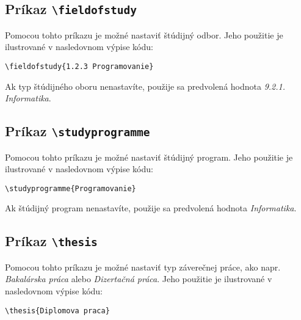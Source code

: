 \subsection{Príkaz {\tt \textbackslash{}fieldofstudy}}

Pomocou tohto príkazu je možné nastaviť štúdijný odbor. Jeho použitie je ilustrované v nasledovnom výpise kódu:

\begin{listing}[ht!]
\begin{verbatim}
\fieldofstudy{1.2.3 Programovanie}
\end{verbatim}
\caption{Príklad použitia príkazu {\tt \textbackslash{}fieldofstudy} pre nastavenie štúdijného oboru}
\end{listing}

Ak typ štúdijného oboru nenastavíte, použije sa predvolená hodnota {\it 9.2.1. Informatika}.


\subsection{Príkaz {\tt \textbackslash{}studyprogramme}}

Pomocou tohto príkazu je možné nastaviť štúdijný program. Jeho použitie je ilustrované v nasledovnom výpise kódu:

\begin{listing}[ht!]
\begin{verbatim}
\studyprogramme{Programovanie}
\end{verbatim}
\caption{Príklad použitia príkazu {\tt \textbackslash{}studyprogramme} pre nastavenie štúdijného programu}
\end{listing}

Ak štúdijný program nenastavíte, použije sa predvolená hodnota {\it Informatika}.


\subsection{Príkaz {\tt \textbackslash{}thesis}}

Pomocou tohto príkazu je možné nastaviť typ záverečnej práce, ako napr. {\it Bakalárska práca} alebo {\it Dizertačná práca}. Jeho použitie je ilustrované v nasledovnom výpise kódu:

\begin{listing}[ht!]
\begin{verbatim}
\thesis{Diplomova praca}
\end{verbatim}
\caption{Nastavenie typu záverečnej práce}
\end{listing}

